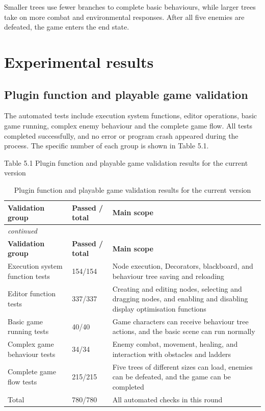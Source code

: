 \documentclass[11pt,a4paper,oneside,extrafontsizes]{memoir}
\begin{document}
Smaller trees use fewer branches to complete basic behaviours, while larger trees take on more combat and environmental responses. After all five enemies are defeated, the game enters the end state.

\chapter{Experimental results}

\section{Plugin function and playable game validation}

The automated tests include execution system functions, editor operations, basic game running, complex enemy behaviour and the complete game flow. All tests completed successfully, and no error or program crash appeared during the process. The specific number of each group is shown in Table 5.1.

Table 5.1 Plugin function and playable game validation results for the current version

\begin{center}

\begin{longtable}{@{}p{} p{} p{}@{}}
\caption{Plugin function and playable game validation results for the current version}\label{tab:function-game-validation}\\
\toprule
\textbf{Validation group} & \textbf{Passed / total} & \textbf{Main scope} \\
\midrule
\endfirsthead
\multicolumn{3}{l}{\itshape continued}\\
\toprule
\textbf{Validation group} & \textbf{Passed / total} & \textbf{Main scope} \\
\midrule
\endhead
Execution system function tests & 154/154 & Node execution, Decorators, blackboard, and behaviour tree saving and reloading \\
Editor function tests & 337/337 & Creating and editing nodes, selecting and dragging nodes, and enabling and disabling display optimisation functions \\
Basic game running tests & 40/40 & Game characters can receive behaviour tree actions, and the basic scene can run normally \\
Complex game behaviour tests & 34/34 & Enemy combat, movement, healing, and interaction with obstacles and ladders \\
Complete game flow tests & 215/215 & Five trees of different sizes can load, enemies can be defeated, and the game can be completed \\
Total & 780/780 & All automated checks in this round \\
\bottomrule
\end{longtable}
\end{center}
\end{document}
